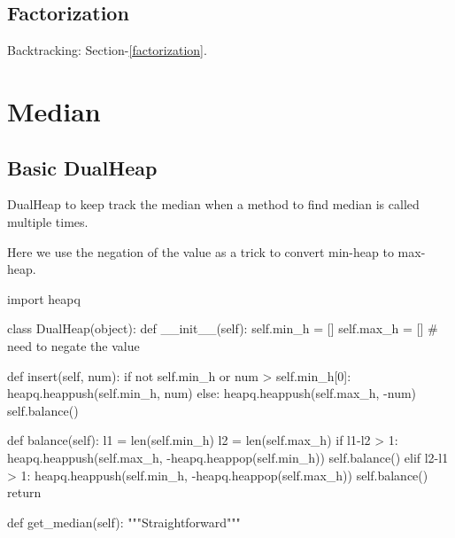 \subsection{Factorization}
Backtracking: Section-\ref{factorization}.

\section{Median}
\subsection{Basic DualHeap}
DualHeap to keep track the median when a method to find median is called multiple times.

Here we use the negation of the value as a trick to convert min-heap to max-heap.
\begin{python}
import heapq

class DualHeap(object):
  def __init__(self):
    self.min_h = []
    self.max_h = []  # need to negate the value 

  def insert(self, num):
    if not self.min_h or num > self.min_h[0]:
      heapq.heappush(self.min_h, num)
    else:
      heapq.heappush(self.max_h, -num)
    self.balance()

  def balance(self):
    l1 = len(self.min_h)
    l2 = len(self.max_h)
    if l1-l2 > 1:
      heapq.heappush(self.max_h, 
                     -heapq.heappop(self.min_h))
      self.balance()
    elif l2-l1 > 1:
      heapq.heappush(self.min_h, 
                     -heapq.heappop(self.max_h))
      self.balance()
    return

  def get_median(self):
    """Straightforward"""
\end{python}

